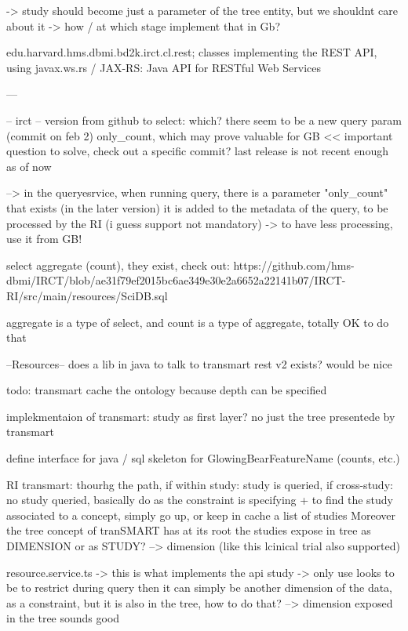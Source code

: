 -> study should become just a parameter of the tree entity, but we shouldnt care about it
-> how / at which stage implement that in Gb?

edu.harvard.hms.dbmi.bd2k.irct.cl.rest;
classes implementing the REST API, using javax.ws.rs / JAX-RS: Java API for RESTful Web Services

---

-- irct --
version from github to select: which? there seem to be a new query param (commit on feb 2) only\_count, which may prove valuable for GB << important question to solve, check out a specific commit? last release is not recent enough as of now 

--> in the queryesrvice, when running query, there is a parameter "only\_count" that exists (in the later version)
it is added to the metadata of the query, to be processed by the RI (i guess support not mandatory) 
-> to have less processing, use it from GB!

select aggregate (count), they exist, check out: https://github.com/hms-dbmi/IRCT/blob/ae31f79ef2015bc6ae349e30e2a6652a22141b07/IRCT-RI/src/main/resources/SciDB.sql

aggregate is a type of select, and count is a type of aggregate, totally OK to do that 



--Resources--
does a lib in java to talk to transmart rest v2 exists? would be nice


todo: transmart cache the ontology because depth can be specified

implekmentaion of transmart: study as first layer? no just the tree presentede by transmart

define interface for java / sql skeleton for GlowingBearFeatureName (counts, etc.)


RI transmart: thourhg the path, if within study: study is queried, if cross-study: no study queried, basically do as the constraint is specifying
+ to find the study associated to a concept, simply go up, or keep in cache a list of studies
Moreover the tree concept of tranSMART has at its root the studies
expose in tree as DIMENSION or as STUDY? --> dimension (like this lcinical trial also supported)


resource.service.ts -> this is what implements the api
study -> only use looks to be to restrict during query
then it can simply be another dimension of the data, as a constraint, but it is also in the tree, how to do that?
--> dimension exposed in the tree sounds good

